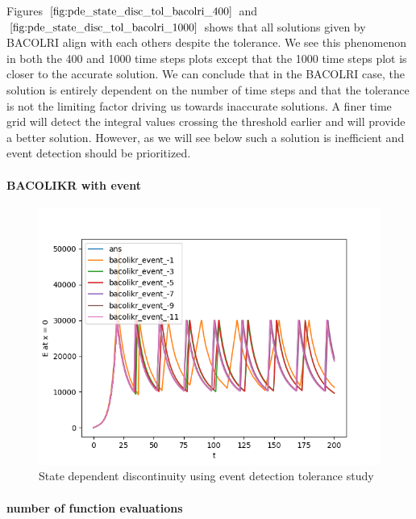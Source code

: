 \documentclass{article}
\begin{document}
Figures $\ref{fig:pde_state_disc_tol_bacolri_400}$ and $\ref{fig:pde_state_disc_tol_bacolri_1000}$ shows that all solutions given by BACOLRI align with each others despite the tolerance. We see this phenomenon in both the 400 and 1000 time steps plots except that the 1000 time steps plot is closer to the accurate solution. We can conclude that in the BACOLRI case, the solution is entirely dependent on the number of time steps and that the tolerance is not the limiting factor driving us towards inaccurate solutions. A finer time grid will detect the integral values crossing the threshold earlier and will provide a better solution. However, as we will see below such a solution is inefficient and event detection should be prioritized. 

\paragraph{BACOLIKR with event}
\begin{figure}[H]
\centering
\includegraphics[width=0.7\linewidth]{./figures/pde_state_disc_tol_event}
\caption{State dependent discontinuity using event detection tolerance study}
\label{fig:pde_state_disc_tol_event}
\end{figure}

\paragraph{number of function evaluations}
\end{document}
